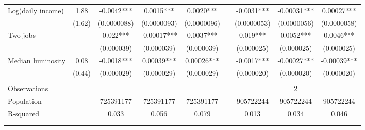 \begin{tabular}{lclllrlll}
Log(daily income) & 1.88  & \multicolumn{1}{c}{-0.0042***} & \multicolumn{1}{c}{0.0015***} & \multicolumn{1}{c}{0.0020***} &       & \multicolumn{1}{c}{-0.0031***} & \multicolumn{1}{c}{-0.00031***} & \multicolumn{1}{c}{0.00027***} \\
      & (1.62) & \multicolumn{1}{c}{(0.0000088)} & \multicolumn{1}{c}{(0.0000093)} & \multicolumn{1}{c}{(0.0000096)} &       & \multicolumn{1}{c}{(0.0000053)} & \multicolumn{1}{c}{(0.0000056)} & \multicolumn{1}{c}{(0.0000058)} \\
Two jobs &       & \multicolumn{1}{c}{0.022***} & \multicolumn{1}{c}{-0.00017***} & \multicolumn{1}{c}{0.0037***} &       & \multicolumn{1}{c}{0.019***} & \multicolumn{1}{c}{0.0052***} & \multicolumn{1}{c}{0.0046***} \\
      &       & \multicolumn{1}{c}{(0.000039)} & \multicolumn{1}{c}{(0.000039)} & \multicolumn{1}{c}{(0.000039)} &       & \multicolumn{1}{c}{(0.000025)} & \multicolumn{1}{c}{(0.000025)} & \multicolumn{1}{c}{(0.000025)} \\
Median luminosity & 0.08  & \multicolumn{1}{c}{-0.0018***} & \multicolumn{1}{c}{0.00039***} & \multicolumn{1}{c}{0.00026***} &       & \multicolumn{1}{c}{-0.0017***} & \multicolumn{1}{c}{-0.00027***} & \multicolumn{1}{c}{-0.00039***} \\
      & (0.44) & \multicolumn{1}{c}{(0.000029)} & \multicolumn{1}{c}{(0.000029)} & \multicolumn{1}{c}{(0.000029)} &       & \multicolumn{1}{c}{(0.000020)} & \multicolumn{1}{c}{(0.000020)} & \multicolumn{1}{c}{(0.000020)} \\
      &       &       &       &       &       &       &       &  \\
\midrule
Observations &       & \multicolumn{1}{c}{} & \multicolumn{1}{c}{} & \multicolumn{1}{c}{} &       & \multicolumn{1}{c}{} & \multicolumn{1}{c}{2} & \multicolumn{1}{c}{} \\
Population &       & \multicolumn{1}{c}{725391177} & \multicolumn{1}{c}{725391177} & \multicolumn{1}{c}{725391177} &       & \multicolumn{1}{c}{905722244} & \multicolumn{1}{c}{905722244} & \multicolumn{1}{c}{905722244} \\
R-squared &       & \multicolumn{1}{c}{0.033} & \multicolumn{1}{c}{0.056} & \multicolumn{1}{c}{0.079} &       & \multicolumn{1}{c}{0.013} & \multicolumn{1}{c}{0.034} & \multicolumn{1}{c}{0.046} \\
\midrule
\midrule
      &       &       &       &       &       &       &       &  \\
      &       &       &       &       &       &       &       &  \\

\end{tabular}
